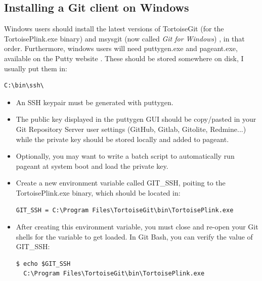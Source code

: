 \documentclass[a4paper]{../../common/tufte-latex/tufte-handout}
\begin{document}
\subsection{Installing a Git client on Windows}\label{sec:preparation}

Windows users should install the latest versions of TortoiseGit  (for the TortoisePlink.exe binary) and msysgit (now called \textit{Git for Windows}) , in that order.
Furthermore, windows users will need puttygen.exe and pageant.exe, available on the Putty website . These should be stored somewhere on disk, I usually put them in:

\begin{lstlisting}[style=BashInputStyle]
  C:\bin\ssh\
\end{lstlisting}

\begin{itemize}

\item{An SSH keypair must be generated with puttygen.}
\item{The public key displayed in the puttygen GUI should be copy/pasted in your Git Repository Server user settings (GitHub, Gitlab, Gitolite, Redmine...) while the private key should be stored locally and added to pageant.} 
\item{Optionally, you may want to write a batch script to automatically run pageant at system boot and load the private key.}
\item{Create a new environment variable called GIT\_SSH, poiting to the TortoisePlink.exe binary, which should be located in:}

\begin{lstlisting}[style=BashInputStyle]
  GIT_SSH = C:\Program Files\TortoiseGit\bin\TortoisePlink.exe
\end{lstlisting}

\item{After creating this environment variable, you must close and re-open your Git shells for the variable to get loaded. In Git Bash, you can verify the value of GIT\_SSH:}

\begin{lstlisting}[style=BashInputStyle]
  $ echo $GIT_SSH
  C:\Program Files\TortoiseGit\bin\TortoisePlink.exe
\end{lstlisting}

\end{itemize}
\end{document}
